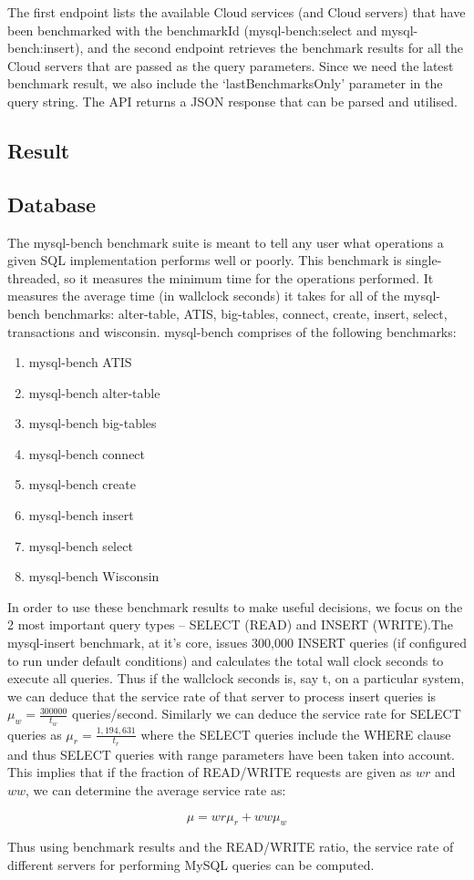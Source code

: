The first endpoint lists the available Cloud services (and Cloud servers) that have been
benchmarked with the benchmarkId (mysql-bench:select and mysql-bench:insert), and the
second endpoint retrieves the benchmark results for all the Cloud servers that are passed as the
query parameters. Since we need the latest benchmark result, we also include the
‘lastBenchmarksOnly’ parameter in the query string. The API returns a JSON response that
can be parsed and utilised.

\subsection{Result}


\subsection{Database}

The mysql-bench benchmark suite is meant to tell any user what operations a given SQL implementation performs well or poorly. This benchmark is single-threaded, so it measures the minimum time for the operations performed. It measures the average time (in wallclock seconds) it takes for all of the mysql-bench benchmarks: alter-table, ATIS, big-tables, connect, create, insert, select, transactions and wisconsin. mysql-bench comprises of the following benchmarks:


\begin{enumerate}
  \item mysql-bench ATIS
  \item mysql-bench alter-table
  \item mysql-bench big-tables
  \item mysql-bench connect
  \item mysql-bench create
  \item mysql-bench insert
  \item mysql-bench select
  \item mysql-bench Wisconsin 
\end{enumerate}


In order to use these benchmark results to make useful decisions, we focus on the 2 most important query types – SELECT (READ) and INSERT (WRITE).The mysql-insert benchmark, at it’s core, issues 300,000 INSERT queries (if configured to run under default conditions) and calculates the total wall clock seconds to execute all queries. Thus if the wallclock seconds is, say t, on a particular system, we can deduce that the service rate of that server to process insert queries is $ \mu_w = \frac{300000}{t_w} $ queries/second. Similarly we can deduce the service rate for SELECT queries as $ \mu_r = \frac{1,194,631}{t_r} $ where the SELECT queries include the WHERE clause and thus SELECT queries with range parameters have been taken into account. This implies that if the fraction of READ/WRITE requests are given as $wr$ and $ww$, we can determine the average service rate as:

\begin{equation}\label{eq:db_workload}
\mu = wr \mu_r + ww \mu_w
\end{equation}

Thus using benchmark results and the READ/WRITE ratio, the service rate of different servers for performing MySQL queries can be computed.







